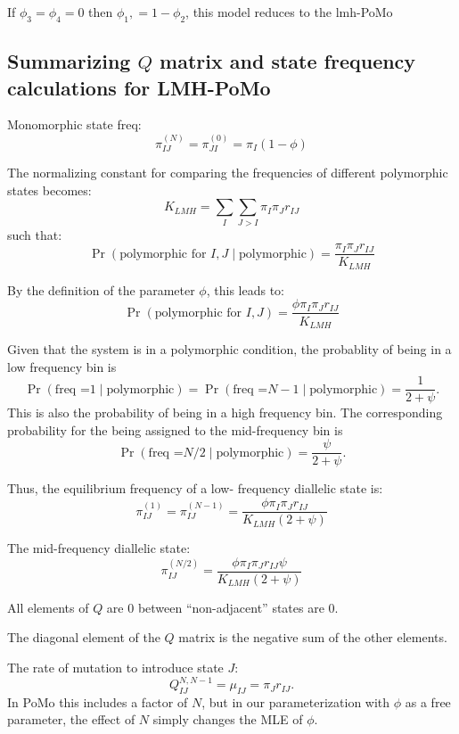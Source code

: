 \documentclass{llncs}
\newcommand{\polyProb}{\ensuremath{\phi}}}
\newcommand{\Klmh}{\ensuremath{K_{LMH}}}}
\begin{document}
If $\phi_3 = \phi_4 = 0$ then $\phi_1, = 1- \phi_2$, this model reduces to the lmh-PoMo

\subsection*{Summarizing $Q$ matrix and state frequency calculations for LMH-PoMo}

Monomorphic state freq: 
\begin{equation}
    \pi_{IJ}^{(N)} = \pi_{JI}^{(0)} = \pi_I(1-\polyProb)
\end{equation}

The normalizing constant for comparing the frequencies of different polymorphic states becomes:
\begin{equation}
    \Klmh = \sum_I\sum_{J > I}\pi_I\pi_J r_{IJ}
\end{equation}
such that:
    $$\Pr(\mbox{polymorphic for }I, J \mid \mbox{polymorphic}) = \frac{\pi_I\pi_J r_{IJ}}{\Klmh}$$

By the definition of the parameter $\phi$, this leads to:
    $$\Pr(\mbox{polymorphic for }I, J) = \frac{\phi\pi_I\pi_J r_{IJ}}{\Klmh}$$

Given that the system is in a polymorphic condition, the probablity of being in a low frequency bin is 
    $$\Pr(\mbox{freq =} 1 \mid \mbox{polymorphic}) = \Pr(\mbox{freq =} N -1 \mid \mbox{polymorphic}) = \frac{1}{2 + \psi}.$$
This is also the probability of being in a high frequency bin.
The corresponding probability for the being assigned to the mid-frequency bin is 
$$\Pr(\mbox{freq =} N/2 \mid \mbox{polymorphic}) =  \frac{\psi}{2 + \psi}.$$

Thus, the equilibrium frequency of a low- frequency diallelic state is: 
\begin{equation}
    \pi_{IJ}^{(1)} = \pi_{IJ}^{(N-1)}  =  \frac{\polyProb\pi_I\pi_J r_{IJ}}{\Klmh (2 + \psi)}
\end{equation}

The mid-frequency diallelic state: 
\begin{equation}
    \pi_{IJ}^{(N/2)} = \frac{\polyProb\pi_I\pi_J r_{IJ}\psi}{\Klmh (2 + \psi)} 
\end{equation}


All elements of $Q$ are 0 between ``non-adjacent'' states are 0.

The diagonal element of the $Q$ matrix is the negative sum of the other elements.

The rate of mutation to introduce state $J$:
\begin{equation}
   Q_{IJ}^{N,N-1} = \mu_{IJ} = \pi_J r_{IJ}.
\end{equation}
In PoMo this includes a factor of $N$, but in our parameterization with $\phi$ as a free parameter, the effect of $N$ simply changes the MLE of $\phi$.
\end{document}
